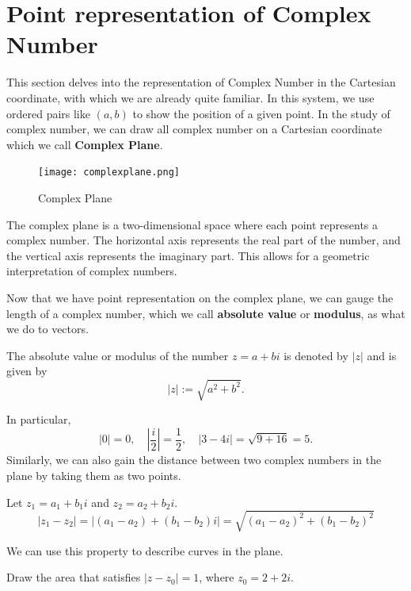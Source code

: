 \documentclass[
	12pt, %
	fleqn, %
	a4paper, %
]{LegrandOrangeBook}
\begin{document}
\section{Point representation of Complex Number}
This section delves into the representation of Complex Number in the Cartesian coordinate, with which we are 
already quite familiar. In this system, we use ordered pairs like $(a,b)$ to show the position of a given point.
In the study of complex number, we can draw all complex number on a Cartesian coordinate which we call \textbf{Complex Plane}.

\begin{figure}[H]
    \centering
    \texttt{[image: complexplane.png]}
    \caption{Complex Plane}
\end{figure}

\begin{definition}
    The complex plane is a two-dimensional space where each point represents a complex number. The horizontal axis represents the real part of the number, and the vertical axis represents the imaginary part. This allows for a geometric interpretation of complex numbers.
\end{definition}
Now that we have point representation on the complex plane, we can gauge the length of a complex number, which we call
\textbf{absolute value} or \textbf{modulus}, as what we do to vectors.
\begin{definition}
    The absolute value or modulus of the number \( z = a + bi \) is denoted by \( |z| \) and is given by
\[ |z| := \sqrt{a^2 + b^2}. \]
\end{definition}
In particular,
\[ |0| = 0, \quad \left|\frac{i}{2}\right| = \frac{1}{2}, \quad |3 - 4i| = \sqrt{9 + 16} = 5. \]
Similarly, we can also gain the distance between two complex numbers in the plane by taking them as two points.
\begin{definition}
    Let \( z_1 = a_1 + b_1i \) and \( z_2 = a_2 + b_2i \). 
    \begin{equation}
        |z_1 - z_2| = |(a_1 - a_2) + (b_1 - b_2)i| = \sqrt{(a_1 - a_2)^2 + (b_1 - b_2)^2}
    \end{equation}
\end{definition}
We can use this property to describe curves in the plane.
\begin{example}
    Draw the area that satisfies $|z-z_0|=1$, where $z_0 = 2+2i$.
\end{example}
\end{document}
